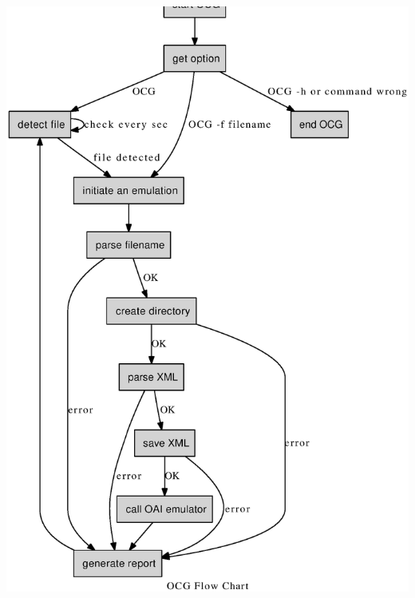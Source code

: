 \begin{center}
\begin{ImageNoCaption}\mbox{\includegraphics{inline_dotgraph_1}}
\end{ImageNoCaption}
\end{center}
 